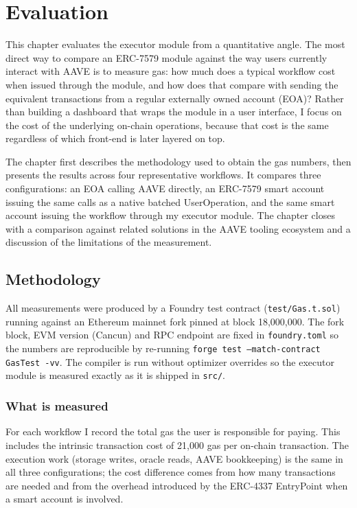 \chapter{Evaluation}
\label{chap:evaluation}

This chapter evaluates the executor module from a quantitative angle. The most
direct way to compare an ERC-7579 module against the way users currently
interact with AAVE is to measure gas: how much does a typical workflow cost
when issued through the module, and how does that compare with sending the
equivalent transactions from a regular externally owned account (EOA)? Rather
than building a dashboard that wraps the module in a user interface, I focus
on the cost of the underlying on-chain operations, because that cost is the
same regardless of which front-end is later layered on top.

The chapter first describes the methodology used to obtain the gas numbers,
then presents the results across four representative workflows. It compares
three configurations: an EOA calling AAVE directly, an ERC-7579 smart account
issuing the same calls as a native batched UserOperation, and the same smart
account issuing the workflow through my executor module. The chapter closes
with a comparison against related solutions in the AAVE tooling ecosystem and
a discussion of the limitations of the measurement.

\section{Methodology}

All measurements were produced by a Foundry test contract (\texttt{test/Gas.t.sol})
running against an Ethereum mainnet fork pinned at block 18,000,000. The fork
block, EVM version (Cancun) and RPC endpoint are fixed in \texttt{foundry.toml}
so the numbers are reproducible by re-running \texttt{forge test
--match-contract GasTest -vv}. The compiler is run without optimizer overrides
so the executor module is measured exactly as it is shipped in \texttt{src/}.

\subsection{What is measured}

For each workflow I record the total gas the user is responsible for paying.
This includes the intrinsic transaction cost of 21{,}000 gas per on-chain
transaction. The execution work (storage writes, oracle reads, AAVE bookkeeping)
is the same in all three configurations; the cost difference comes from how
many transactions are needed and from the overhead introduced by the
ERC-4337 EntryPoint when a smart account is involved.

